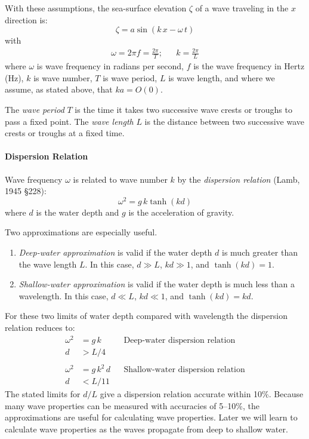 With these assumptions, the sea-surface elevation $\zeta$ of a wave
traveling in the $x$ direction is:
\begin{equation}
\zeta = a \sin (k \, x - \omega \, t)
\end{equation}
with
\begin{eqnarray}
\omega = 2 \pi f = \frac{2 \pi}{T}; & & k = \frac{2 \pi}{L}
\end{eqnarray}
where $\omega$ is wave frequency in radians per second, $f$ is the
wave frequency in Hertz (Hz), $k$ is wave number, $T$ is wave period,
$L$ is wave length, and where we assume, as stated above, that $ka = O(0)$.

The \textit{wave period} $T$ is the time it
takes two successive wave crests or troughs to pass a fixed point. The
\textit{wave length} $L$ is the distance
between two successive wave crests or troughs at a fixed time.


\paragraph{Dispersion Relation}
Wave frequency $\omega$ is related to wave number
$k$ by the \textit{dispersion relation} (Lamb, 1945 \S{228}):
\begin{equation}
\omega ^{2} = g \, k \tanh (k d)
\end{equation}
where $d$ is the water depth and $g$ is the acceleration of gravity.

Two approximations are especially useful.
\begin{enumerate}
\item \textit{Deep-water approximation} is valid if the water depth
$d$ is much greater than the wave length $L$. In this case, $d \gg L$,
$kd \gg 1$, and $\tanh (kd) = 1$.

\item \textit{Shallow-water approximation} is valid if the water depth
is much less than a wavelength. In this case, $d \ll L$, $kd \ll 1$,
and $\tanh (kd) = kd$.
\end{enumerate}
For these two limits of water depth compared with wavelength the
dispersion relation reduces to:
\begin{align}
  \omega ^2 &= g \, k & & \text{Deep-water dispersion relation}\\
  d &> L/4 & &  \nonumber \\
   & & \nonumber \\
  \omega ^2 &= g \, k^{2} \, d & & \text{Shallow-water dispersion relation}\\
   d &< L/11 & & \nonumber
\end{align}
The stated limits for $d/L$ give a dispersion relation accurate within
10\%.  Because many wave properties can be measured with accuracies of
5--10\%, the approximations are useful for calculating wave
properties. Later we will learn to calculate wave properties as the
waves propagate from deep to shallow water.

